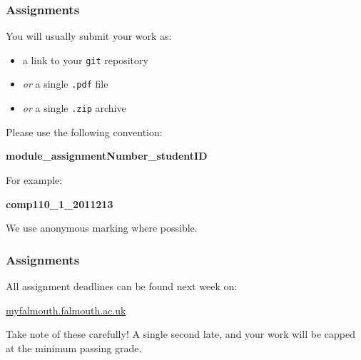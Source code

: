 \begin{frame}
	\frametitle{Assignments}
	
	You will usually submit your work as:
	
	\begin{itemize}
	    \item a link to your \texttt{git} repository
	    \item \textit{or} a single \texttt{.pdf} file
	    \item \textit{or} a single \texttt{.zip} archive
	\end{itemize}
	
	\vspace{1em}
	
	 Please use the following convention:
	
	\begin{large}
		\begin{center}
			\textbf{module\_assignmentNumber\_studentID}
		\end{center}
	\end{large}
	
	For example:
	
	\begin{Large}
		\begin{center}
			\textbf{comp110\_1\_2011213}
		\end{center}
	\end{Large}
	
	\vspace{1em}
	
	We use anonymous marking where possible.

\end{frame}

\begin{frame}
	\frametitle{Assignments}
		
	All assignment deadlines can be found next week on:
	
	\vspace{1em}
	
	\indent \url{myfalmouth.falmouth.ac.uk}
	
	\vspace{1em}
	
	Take note of these carefully! A single second late, and your work will be capped at the minimum passing grade.
	
\end{frame}

